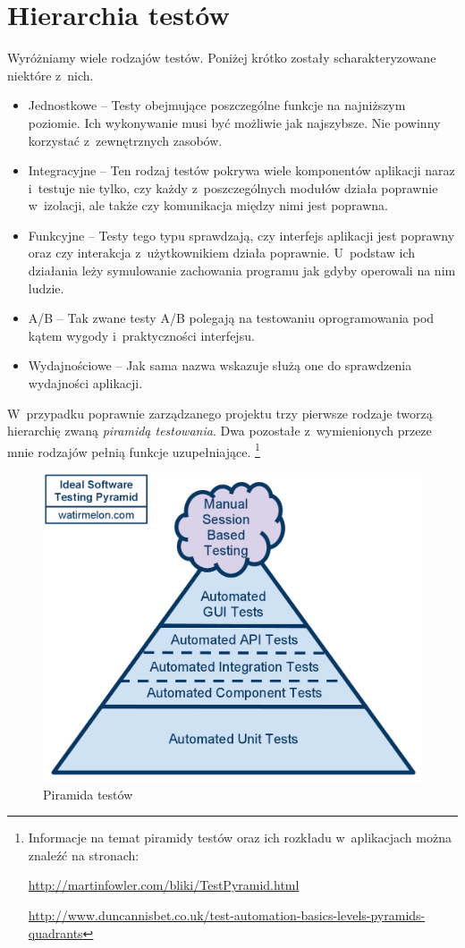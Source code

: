 \documentclass[brudnopis]{xmgr}
\begin{document}
\section{Hierarchia testów}

Wyróżniamy wiele rodzajów testów. Poniżej krótko zostały scharakteryzowane niektóre z~nich.
\begin{itemize}
  \item Jednostkowe -- Testy obejmujące poszczególne funkcje na najniższym poziomie. Ich wykonywanie musi być możliwie jak najszybsze. Nie powinny korzystać z~zewnętrznych zasobów.
  \item Integracyjne -- Ten rodzaj testów pokrywa wiele komponentów aplikacji naraz i~testuje nie tylko, czy każdy z~poszczególnych modułów działa poprawnie w~izolacji, ale także czy komunikacja między nimi jest poprawna.
  \item Funkcyjne -- Testy tego typu sprawdzają, czy interfejs aplikacji jest poprawny oraz czy interakcja z~użytkownikiem działa poprawnie. U~podstaw ich działania leży symulowanie zachowania programu jak gdyby operowali na nim ludzie. 
  \item A/B -- Tak zwane testy A/B polegają na testowaniu oprogramowania pod kątem wygody i~praktyczności interfejsu.
  \item Wydajnościowe -- Jak sama nazwa wskazuje służą one do sprawdzenia wydajności aplikacji.
\end{itemize}

W~przypadku poprawnie zarządzanego projektu trzy pierwsze rodzaje tworzą hierarchię zwaną \textit{piramidą testowania}. Dwa pozostałe z~wymienionych przeze mnie rodzajów pełnią funkcje uzupełniające. 
\footnote{
Informacje na temat piramidy testów oraz ich rozkładu w~aplikacjach można znaleźć na stronach:

\url{http://martinfowler.com/bliki/TestPyramid.html}

\url{http://www.duncannisbet.co.uk/test-automation-basics-levels-pyramids-quadrants}
}

\begin{figure}[h]
    \centering
    \includegraphics[scale=0.25]{idealautomatedtestingpyramid.png}
    \caption{Piramida testów}
    \label{fig:pyramis}
\end{figure}
\end{document}
